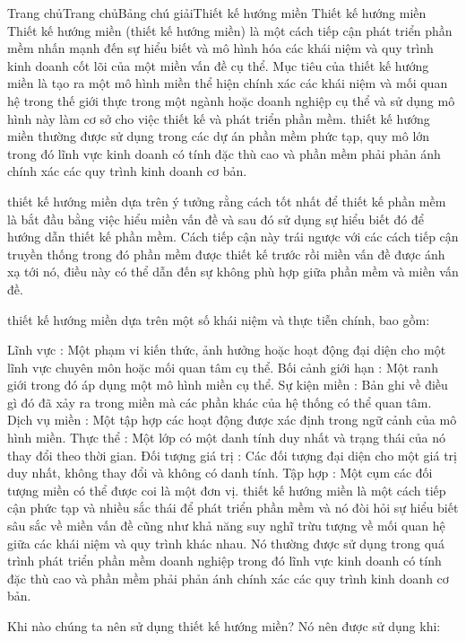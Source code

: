 Trang chủTrang chủBảng chú giảiThiết kế hướng miền
Thiết kế hướng miền
Thiết kế hướng miền (thiết kế hướng miền) là một cách tiếp cận phát triển phần mềm nhấn mạnh đến sự hiểu biết và mô hình hóa các khái niệm và quy trình kinh doanh cốt lõi của một miền vấn đề cụ thể. Mục tiêu của thiết kế hướng miền là tạo ra một mô hình miền thể hiện chính xác các khái niệm và mối quan hệ trong thế giới thực trong một ngành hoặc doanh nghiệp cụ thể và sử dụng mô hình này làm cơ sở cho việc thiết kế và phát triển phần mềm. thiết kế hướng miền thường được sử dụng trong các dự án phần mềm phức tạp, quy mô lớn trong đó lĩnh vực kinh doanh có tính đặc thù cao và phần mềm phải phản ánh chính xác các quy trình kinh doanh cơ bản.

thiết kế hướng miền dựa trên ý tưởng rằng cách tốt nhất để thiết kế phần mềm là bắt đầu bằng việc hiểu miền vấn đề và sau đó sử dụng sự hiểu biết đó để hướng dẫn thiết kế phần mềm. Cách tiếp cận này trái ngược với các cách tiếp cận truyền thống trong đó phần mềm được thiết kế trước rồi miền vấn đề được ánh xạ tới nó, điều này có thể dẫn đến sự không phù hợp giữa phần mềm và miền vấn đề.

thiết kế hướng miền dựa trên một số khái niệm và thực tiễn chính, bao gồm:

Lĩnh vực : Một phạm vi kiến thức, ảnh hưởng hoặc hoạt động đại diện cho một lĩnh vực chuyên môn hoặc mối quan tâm cụ thể.
Bối cảnh giới hạn : Một ranh giới trong đó áp dụng một mô hình miền cụ thể.
Sự kiện miền : Bản ghi về điều gì đó đã xảy ra trong miền mà các phần khác của hệ thống có thể quan tâm.
Dịch vụ miền : Một tập hợp các hoạt động được xác định trong ngữ cảnh của mô hình miền.
Thực thể : Một lớp có một danh tính duy nhất và trạng thái của nó thay đổi theo thời gian.
Đối tượng giá trị : Các đối tượng đại diện cho một giá trị duy nhất, không thay đổi và không có danh tính.
Tập hợp : Một cụm các đối tượng miền có thể được coi là một đơn vị.
thiết kế hướng miền là một cách tiếp cận phức tạp và nhiều sắc thái để phát triển phần mềm và nó đòi hỏi sự hiểu biết sâu sắc về miền vấn đề cũng như khả năng suy nghĩ trừu tượng về mối quan hệ giữa các khái niệm và quy trình khác nhau. Nó thường được sử dụng trong quá trình phát triển phần mềm doanh nghiệp trong đó lĩnh vực kinh doanh có tính đặc thù cao và phần mềm phải phản ánh chính xác các quy trình kinh doanh cơ bản.

Khi nào chúng ta nên sử dụng thiết kế hướng miền?
Nó nên được sử dụng khi:


